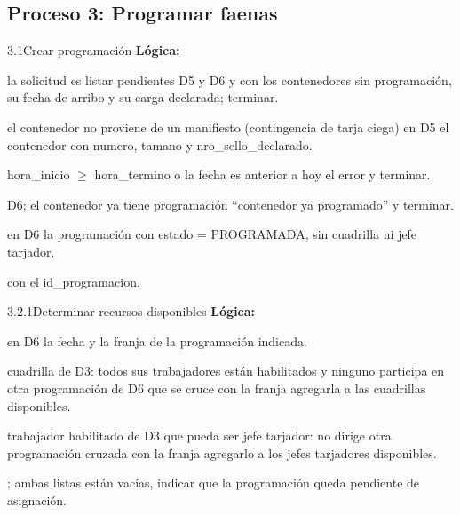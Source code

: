 \subsection{Proceso 3: Programar faenas}

\begin{minispec}{3.1}{Crear programación}
\textbf{Lógica:}
\begin{logica}
    \item {} la solicitud es listar pendientes  D5 y D6 y 
     con los contenedores sin programación, su fecha de
    arribo y su carga declarada; terminar.
    \item {} el contenedor no proviene de un manifiesto (contingencia de tarja ciega)
     en D5 el contenedor con numero, tamano y nro\_sello\_declarado.
    \item {} hora\_inicio $\geq$ hora\_termino o la fecha es anterior a hoy  el error y terminar.
    \item {} D6;  el contenedor ya tiene programación 
    ``contenedor ya programado'' y terminar.
    \item {} en D6 la programación con estado = PROGRAMADA, sin cuadrilla ni jefe
    tarjador.
    \item {}  con el id\_programacion.
\end{logica}
\end{minispec}

\begin{minispec}{3.2.1}{Determinar recursos disponibles}
\textbf{Lógica:}
\begin{logica}
    \item {} en D6 la fecha y la franja de la programación indicada.
    \item {} cuadrilla de D3:  todos sus trabajadores están habilitados y
    ninguno participa en otra programación de D6 que se cruce con la franja 
    agregarla a las cuadrillas disponibles.
    \item {} trabajador habilitado de D3 que pueda ser jefe tarjador:  no
    dirige otra programación cruzada con la franja  agregarlo a los jefes
    tarjadores disponibles.
    \item {} ;  ambas listas están vacías, indicar que
    la programación queda pendiente de asignación.
\end{logica}
\end{minispec}

